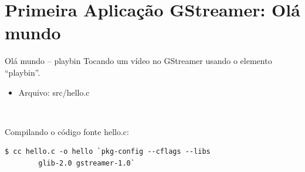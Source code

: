 \documentclass{beamer}
\begin{document}
\section{Primeira Aplicação GStreamer: Olá mundo}
\begin{frame}[fragile]{Olá mundo -- playbin}
  Tocando um vídeo no GStreamer usando o elemento ``playbin''.
  \begin{itemize}
    \item Arquivo: src/hello.c
  \end{itemize}
  ~
  
  Compilando o código fonte hello.c:
  \begin{lstlisting}[style=command]
  $ cc hello.c -o hello `pkg-config --cflags --libs 
        glib-2.0 gstreamer-1.0`
  \end{lstlisting}

\end{frame}
\end{document}
